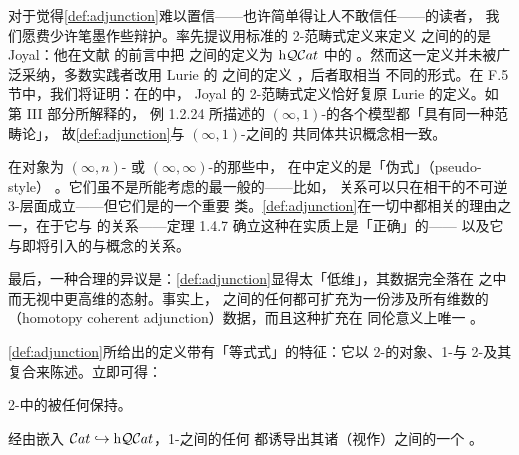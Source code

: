 \begin{digression}\label{dig:justifying-2categorical-adjunction}
对于觉得\cref{def:adjunction}难以置信——也许简单得让人不敢信任——的读者，
我们愿费少许笔墨作些辩护。率先提议用标准的 2-范畴式定义来定义\trInfinityCategory{}%
之间的\trAdjunction{}的是 Joyal：他在文献 \cite{bib63} 的前言中把\trQuasiCategory{}%
之间的\trAdjunction{}定义为\trHomotopyTwoCategory{} $\mathrm{h}\mathcal{Q}\mathcal{C}at$ 中的%
\trAdjunction{}。然而这一定义并未被广泛采纳，多数实践者改用 Lurie 的%
\trQuasiCategory{}之间\trAdjunction{}的定义 \cite[\S 5.2]{bib78}，后者取相当
不同的形式。在 F.5 节中，我们将证明：在\trQuasiCategory{}的\trInfinityCosmos{}中，
Joyal 的 2-范畴式\trAdjunction{}定义恰好复原 Lurie 的定义。如第 III 部分所解释的，
例 1.2.24 所描述的 $(\infty,1)$-\trCategory{}的各个模型都「具有同一种范畴论」，
故\cref{def:adjunction}与 $(\infty,1)$-\trCategory{}之间\trAdjunction{}的
共同体共识概念相一致。

在对象为 $(\infty,n)$- 或 $(\infty,\infty)$-\trCategory{}的那些\trInfinityCosmos{}中，
在\trHomotopyTwoCategory{}中定义的\trAdjunction{}是「伪式」（pseudo-style）%
\trAdjunction{}。它们虽不是所能考虑的最一般的\trAdjunction{}——比如，\trTriangleEqualities
关系可以只在相干的不可逆 3-\trCell{}层面成立——但它们是\trAdjunction{}的一个重要
类。\cref{def:adjunction}在一切\trInfinityCosmos{}中都相关的理由之一，在于它与%
\trEquivalence{}的关系——定理 1.4.7 确立这种\trEquivalence{}在实质上是「正确」的——
以及它与即将引入的\trLimit{}与\trColimit{}概念的关系。

最后，一种合理的异议是：\cref{def:adjunction}显得太「低维」，其数据完全落在%
\trHomotopyTwoCategory{}之中而无视\trInfinityCosmos{}中更高维的态射。事实上，
\trInfinityCategory{}之间的任何\trAdjunction{}都可扩充为一份涉及所有维数的%
\emph{\trHomotopyCoherentAdjunction}（homotopy coherent adjunction）数据，而且这种扩充在
同伦意义上唯一 \cite{bib109}。
\end{digression}

\cref{def:adjunction}所给出的\trAdjunction{}定义带有「等式式」的特征：它以
2-\trCategory{}的对象、1-\trCell{}与 2-\trCell{}及其复合来陈述。立即可得：

\begin{lemma}\label{lem:adjunction-preserved-by-2-functor}
2-\trCategory{}中的\trAdjunction{}被任何\trTwoFunctor{}保持。
\end{lemma}

\begin{example}\label{exa:adjunctions-1-categories}
经由\trNerve{}嵌入 $\mathcal{C}at\hookrightarrow\mathrm{h}\mathcal{Q}\mathcal{C}at$，1-\trCategory{}之间的任何%
\trAdjunction{}都诱导出其诸\trNerve{}（视作\trQuasiCategory{}）之间的一个%
\trAdjunction{}。
\end{example}


